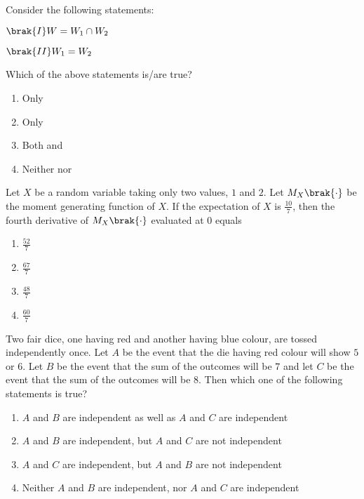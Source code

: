 Consider the following statements:

$\brak{I} W = W_1 \cap W_2$

$\brak{II} W_1 = W_2$

Which of the above statements is/are true?

\begin{enumerate}[label=\brak{\Alph*}]
\item Only 

\item Only 

\item Both  and 

\item Neither  nor 
\end{enumerate}

\item Let $X$ be a random variable taking only two values, $1$ and $2$. Let $M_X\brak{\cdot}$ be the moment generating function of $X$. If the expectation of $X$ is $\frac{10}{7}$, then the fourth derivative of $M_X\brak{\cdot}$ evaluated at $0$ equals

\begin{enumerate}
    \item $\frac{52}{7}$
    \item $\frac{67}{7}$
    \item $\frac{48}{7}$
    \item $\frac{60}{7}$
\end{enumerate}

\item Two fair dice, one having red and another having blue colour, are tossed independently once. Let $A$ be the event that the die having red colour will show $5$ or $6$. Let $B$ be the event that the sum of the outcomes will be $7$ and let $C$ be the event that the sum of the outcomes will be $8$. Then which one of the following statements is true?

\begin{enumerate}
    \item $A$ and $B$ are independent as well as $A$ and $C$ are independent
    \item $A$ and $B$ are independent, but $A$ and $C$ are not independent
    \item $A$ and $C$ are independent, but $A$ and $B$ are not independent
    \item Neither $A$ and $B$ are independent, nor $A$ and $C$ are independent
\end{enumerate}

